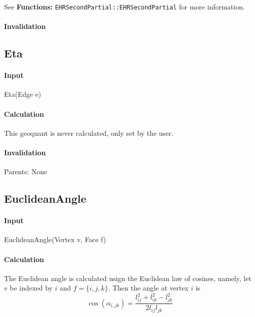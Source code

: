 See \textbf{Functions: }\texttt{EHRSecondPartial::EHRSecondPartial} for more
information.

\paragraph{Invalidation}

\bigskip

\subsection{Eta}

\paragraph{Input }

Eta(Edge e)

\paragraph{Calculation}

This geoquant is never calculated, only set by the user.

\paragraph{Invalidation}

Parents: None

\bigskip

\subsection{EuclideanAngle}

\paragraph{Input}

EuclideanAngle(Vertex v, Face f)

\paragraph{Calculation}

The Euclidean angle is calculated usign the Euclidean law of cosines,
namely, let $v$ be indexed by $i$ and $f=\{i,j,k\}$. Then the angle at
vertex $i$ is%
\begin{equation*}
\cos (\alpha _{i,jk})=\frac{l_{ij}^{2}+l_{ik}^{2}-l_{jk}^{2}}{2l_{ij}l_{jk}}
\end{equation*}

